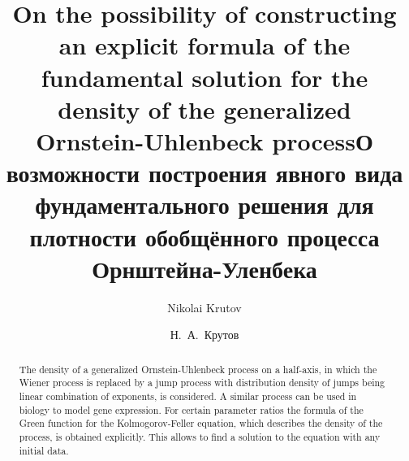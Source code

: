 \begin{englishtitle} %
\title{On the possibility of constructing an explicit formula of the fundamental solution for the density of the generalized Ornstein-Uhlenbeck process}
\author{Nikolai Krutov
}

\maketitle

\begin{abstract}
The density of a generalized Ornstein-Uhlenbeck process on a half-axis, in which the Wiener process is replaced by a jump process with distribution density of jumps being linear combination of exponents, is considered. A similar process can be used in biology to model gene expression. For certain parameter ratios the formula of the Green function for the Kolmogorov-Feller equation,
which describes the density of the process, is obtained explicitly. This allows to find a solution to the equation with any initial data.

\end{abstract}
\end{englishtitle}


\iffalse
%
%


\documentclass[12pt]{llncs}  


\usepackage{iftex}

\ifPDFTeX
\usepackage[T2A]{fontenc}
\usepackage[utf8]{inputenc} %
\usepackage[english,russian]{babel}
\fi

\usepackage{todonotes} 

\usepackage[russian]{nla}


\fi


\title{О возможности построения явного вида фундаментального решения для плотности обобщённого процесса Орнштейна-Уленбека}
\author{Н.~А.~Крутов  
}


